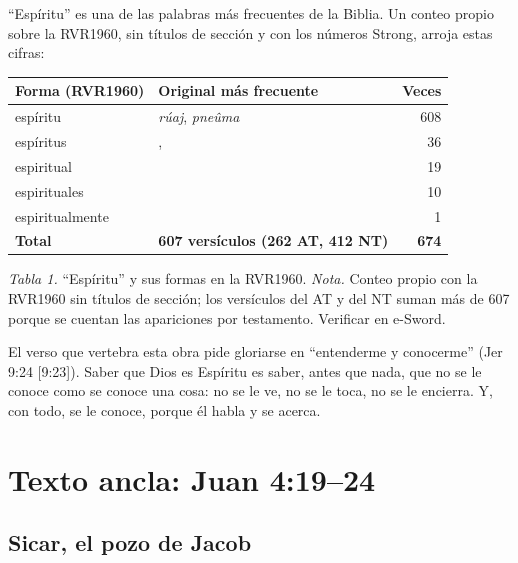 
``Espíritu'' es una de las palabras más frecuentes de la Biblia. Un conteo propio sobre la RVR1960, sin títulos de sección y con los números Strong, arroja estas cifras:

\begin{center}\small\renewcommand{\arraystretch}{1.18}
\begin{tabular}{@{}L{4.2cm}L{5.4cm}r@{}}
\toprule
\textbf{Forma (RVR1960)} & \textbf{Original más frecuente} & \textbf{Veces} \\ \midrule
espíritu &  \emph{rúaj},  \emph{pneûma} & 608 \\
espíritus & ,  & 36 \\
espiritual &  & 19 \\
espirituales &  & 10 \\
espiritualmente &  & 1 \\ \midrule
\textbf{Total} & \textbf{607 versículos (262 AT, 412 NT)} & \textbf{674} \\
\bottomrule
\end{tabular}\par
{\footnotesize\color{gris}\textit{Tabla 1.} ``Espíritu'' y sus formas en la RVR1960. \textit{Nota.} Conteo propio con la RVR1960 sin títulos de sección; los versículos del AT y del NT suman más de 607 porque se cuentan las apariciones por testamento. Verificar en e-Sword.}
\end{center}

El verso que vertebra esta obra pide gloriarse en ``entenderme y conocerme'' (Jer 9:24 [9:23]). Saber que Dios es Espíritu es saber, antes que nada, que no se le conoce como se conoce una cosa: no se le ve, no se le toca, no se le encierra. Y, con todo, se le conoce, porque él habla y se acerca.

\section{Texto ancla: Juan 4:19--24}

\subsection{Sicar, el pozo de Jacob}

